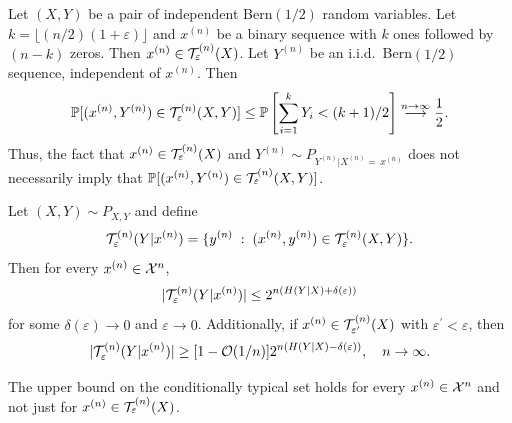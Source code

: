 \documentclass[11pt,a4paper]{article}
\begin{document}
\begin{remark}
    Let $(X,Y)$ be a pair of independent Bern$(1/2)$ random variables. Let $k = \lfloor (n/2)(1+\varepsilon) \rfloor$ and $x^{(n)}$ be a binary sequence with $k$ ones followed by $(n-k)$ zeros. Then $x^{(n)}\in \mathcal{T}^{(n)}_\varepsilon(X)$. Let $Y^{(n)}$ be an i.i.d.~Bern$(1/2)$ sequence, independent of $x^{(n)}$. Then 
    \begin{equation*}
        \mathbb{P}[(x^{(n)},Y^{(n)})\in\mathcal{T}^{(n)}_\varepsilon(X,Y)] \le \mathbb{P}\left[ \sum_{i=1}^k Y_i < (k+1)/2 \right] \overset{n\rightarrow \infty}{\longrightarrow} \dfrac{1}{2}.
    \end{equation*}
    Thus, the fact that $x^{(n)}\in\mathcal{T}^{(n)}_\varepsilon(X)$ and $Y^{(n)}\sim P_{Y^{(n)}|X^{(n)}=\,x^{(n)}}$ does not necessarily imply that $\mathbb{P}[(x^{(n)},Y^{(n)})\in\mathcal{T}^{(n)}_\varepsilon(X,Y)]$.
\end{remark}

\begin{theorem}
    Let $(X,Y)\sim P_{X,Y}$ and define 
    \begin{equation*}
        \mathcal{T}^{(n)}_\varepsilon(Y|x^{(n)}) = \{y^{(n)}\;:\; (x^{(n)},y^{(n)})\in\mathcal{T}^{(n)}_\varepsilon(X,Y)\}.
    \end{equation*}
    Then for every $x^{(n)}\in \mathcal{X}^n$,
    \begin{equation*}
        |\mathcal{T}^{(n)}_\varepsilon (Y|x^{(n)})| \le 2^{n(H(Y|X)+\delta(\varepsilon))}
    \end{equation*}
    for some $\delta(\varepsilon) \rightarrow 0$ and $\varepsilon \rightarrow 0$. Additionally, if $x^{(n)}\in \mathcal{T}^{(n)}_{\varepsilon^\prime}(X)$ with $\varepsilon^\prime < \varepsilon$, then 
    \begin{equation*}
        |\mathcal{T}^{(n)}_\varepsilon (Y|x^{(n)})| \ge [1-\mathcal{O}(1/n)] 2^{n(H(Y|X)-\delta(\varepsilon))}, \quad n\rightarrow \infty.
    \end{equation*}
\end{theorem}

\begin{remark}
    The upper bound on the conditionally typical set holds for every $x^{(n)}\in\mathcal{X}^n$ and not just for $x^{(n)}\in \mathcal{T}^{(n)}_{\varepsilon}(X)$.
\end{remark}
\end{document}
